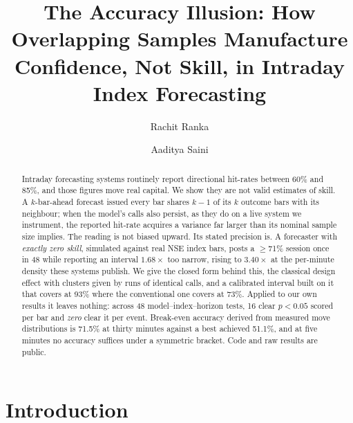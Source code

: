 \documentclass[runningheads]{llncs}
\begin{document}
\title{The Accuracy Illusion: How Overlapping Samples Manufacture
Confidence, Not Skill, in Intraday Index Forecasting}


\author{Rachit Ranka \and Aaditya Saini}



\maketitle

\begin{abstract}
Intraday forecasting systems routinely report directional hit-rates between
60\% and 85\%, and those figures move real capital. We show they are not valid
estimates of skill. A $k$-bar-ahead forecast issued every bar shares $k{-}1$ of
its $k$ outcome bars with its neighbour; when the model's calls also persist, as
they do on a live system we instrument, the reported hit-rate acquires a
variance far larger than its nominal sample size implies. The reading is not
biased upward. Its stated precision is. A forecaster with \emph{exactly zero
skill}, simulated against real NSE index bars, posts a $\geq$71\% session once
in 48 while reporting an interval $1.68\times$ too narrow, rising to
$3.40\times$ at the per-minute density these systems publish. We give the closed form behind this, the classical design effect with clusters
given by runs of identical calls, and a calibrated interval built on it that
covers at 93\% where the conventional one covers at 73\%. Applied to our own
results it leaves nothing: across 48 model--index--horizon tests, 16 clear
$p<0.05$ scored per bar and \emph{zero} clear it per event. Break-even accuracy
derived from measured move distributions is 71.5\% at thirty minutes against a
best achieved 51.1\%, and at five minutes no accuracy suffices under a symmetric
bracket. Code and raw results are public.

\end{abstract}

\section{Introduction}
\end{document}
